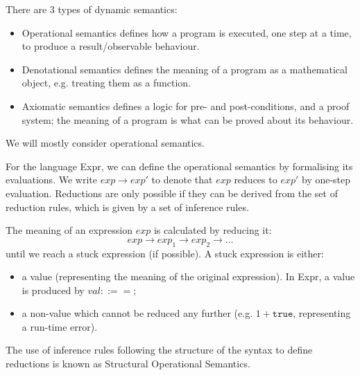 \documentclass[a4paper, openany]{memoir}
\begin{document}
    There are 3 types of dynamic semantics:
    \begin{itemize}
        \item Operational semantics defines how a program is executed, one step at a time, to produce a result/observable behaviour.
        \item Denotational semantics defines the meaning of a program as a mathematical object, e.g. treating them as a function.
        \item Axiomatic semantics defines a logic for pre- and post-conditions, and a proof system; the meaning of a program is what can be proved about its behaviour.
    \end{itemize}
    We will mostly consider operational semantics.

    For the language Expr, we can define the operational semantics by formalising its evaluations. We write $exp \to exp'$ to denote that $exp$ reduces to $exp'$ by one-step evaluation. Reductions are only possible if they can be derived from the set of reduction rules, which is given by a set of inference rules.

    The meaning of an expression $exp$ is calculated by reducing it:
    \[exp \to exp_1 \to exp_2 \to \dots\]
    until we reach a stuck expression (if possible). A stuck expression is either:
    \begin{itemize}
        \item a value (representing the meaning of the original expression). In Expr, a value is produced by $val ::==$;
        \item a non-value which cannot be reduced any further (e.g. $1 + \texttt{true}$, representing a run-time error).
    \end{itemize}
    The use of inference rules following the structure of the syntax to define reductions is known as Structural Operational Semantics.
\end{document}
